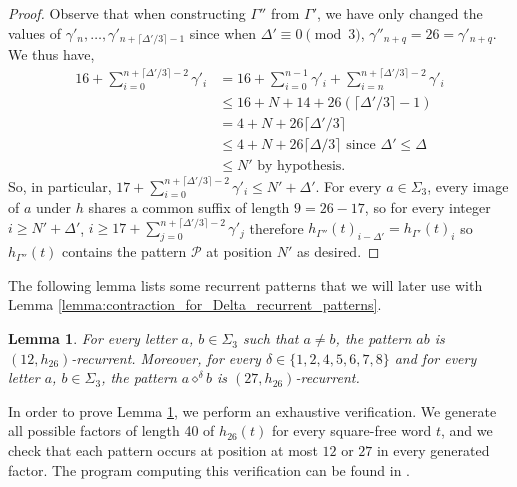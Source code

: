 \documentclass[12pt]{article}
\newtheorem{lemma}[theorem]{Lemma}
\theoremstyle{definition}
\newcommand{\patternprime}[3]{{#1}\diamond^{#2}{#3}}
\begin{document}
\begin{proof}
    Observe that when constructing $\Gamma''$ from $\Gamma'$, we have only changed the values of $\gamma'_n, \dots, \gamma'_{n + \lceil\Delta'/3\rceil - 1}$ since when $\Delta' \equiv 0 \pmod3$, $\gamma''_{n + q} = 26 = \gamma'_{n + q}$. We thus have,
    \begin{align*}
        16 + \sum_{i = 0}^{n + \lceil\Delta'/3\rceil - 2} \gamma'_i &= 16 + \sum_{i = 0}^{n - 1} \gamma'_i + \sum_{i = n}^{n + \lceil\Delta'/3\rceil - 2} \gamma'_i\\
        &\le 16 + N + 14 + 26(\lceil\Delta'/3\rceil - 1)\\
        &= 4 + N + 26\lceil\Delta'/3\rceil\\
        &\le 4 + N + 26\lceil\Delta/3\rceil\textrm{ since } \Delta' \le \Delta\\
        &\le N' \textrm{ by hypothesis}.
    \end{align*}
    So, in particular, $17 + \sum_{i = 0}^{n + \lceil\Delta'/3\rceil - 2} \gamma'_i \le N' + \Delta'$.
    For every $a \in \Sigma_3$, every image of $a$ under $h$ shares a common suffix of length $9 = 26 - 17$, so for every integer $i \ge N' + \Delta'$, $i \ge 17 + \sum_{j = 0}^{n + \lceil\Delta'/3\rceil - 2} \gamma'_j$ therefore $h_{\Gamma''}(t)_{i - \Delta'} = h_{\Gamma'}(t)_{i}$ so $h_{\Gamma''}(t)$ contains the pattern $\mathcal{P}$ at position $N'$ as desired. 
\end{proof}

The following lemma lists some recurrent patterns that we will later use with Lemma \ref{lemma:contraction_for_Delta_recurrent_patterns}.

\begin{lemma}\label{lemma:bound_28_to_see_pattern_again}
    For every letter $a$, $b \in \Sigma_3$ such that $a \neq b$, the pattern $ab$ is $(12, h_{26})$-recurrent.
    Moreover, for every $\delta \in \{1, 2, 4, 5, 6, 7, 8\}$ and for every letter $a$, $b \in \Sigma_3$, the pattern  $\patternprime{a}{\delta}{b}$ is $(27, h_{26})$-recurrent.  
\end{lemma}

In order to prove Lemma \ref{lemma:bound_28_to_see_pattern_again}, we perform an exhaustive verification. We generate all possible factors of length 40 of $h_{26}(t)$ for every square-free word $t$, and we check that each pattern occurs at position at most $12$ or $27$ in every generated factor. The program computing this verification can be found in \cite[lemma\_\ref{lemma:bound_28_to_see_pattern_again}.cpp]{code}.
\end{document}

